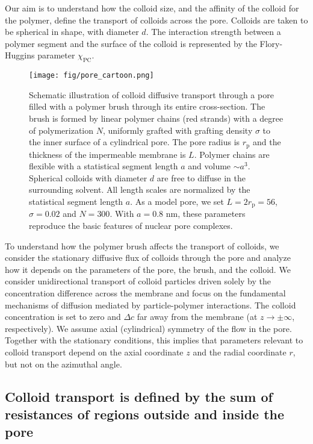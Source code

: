 \documentclass[12pt, a4paper]{article}
\begin{document}
Our aim is to understand how the colloid size, and the affinity of the colloid for the polymer, define the transport of colloids across the pore.
Colloids are taken to be spherical in shape, with diameter $d$.
The interaction strength between a polymer segment and the surface of the colloid is represented by the Flory-Huggins parameter $\chi_{\text{PC}}$.

\begin{figure}
    \centering
    \texttt{[image: fig/pore\_cartoon.png]}
    \caption{
        Schematic illustration of colloid diffusive transport through a pore filled with a polymer brush through its entire cross-section. 
        The brush is formed by linear polymer chains (red strands) with a degree of polymerization $N$, uniformly grafted with grafting density $\sigma$ 
        to the inner surface of a cylindrical pore.
        The pore radius is $r_{\text{p}}$ and the thickness of the impermeable membrane is $L$.
        Polymer chains are flexible with a statistical segment length $a$ and volume $\sim a^3$. 
        Spherical colloids with diameter $d$ are free to diffuse in the surrounding solvent.
        All length scales are normalized by the statistical segment length $a$.
        As a model pore, we set $L = 2r_{\text{p}} = 56$, $\sigma = 0.02$ and $N = 300$.
        With $a = 0.8 {\text{ nm}}$, these parameters reproduce the basic features of nuclear pore complexes.
          }
    \label{fig:colloid_transport}
\end{figure}

To understand how the polymer brush affects the transport of colloids, we consider the stationary diffusive flux of colloids through the pore and analyze how it depends on the parameters of the pore, the brush, and the colloid.
We consider unidirectional transport of colloid particles driven solely by the concentration difference across the membrane and focus on the fundamental mechanisms of diffusion mediated by particle-polymer interactions.
The colloid concentration is set to zero and $\Delta c$ far away from the membrane (at $z\rightarrow\pm\infty$, respectively).
We assume axial (cylindrical) symmetry of the flow in the pore.
Together with the stationary conditions, this implies that parameters relevant to colloid transport depend on the axial coordinate $z$ and the radial coordinate $r$, but not on the azimuthal angle.


\subsection{Colloid transport is defined by the sum of resistances of regions outside and inside the pore}
\end{document}
